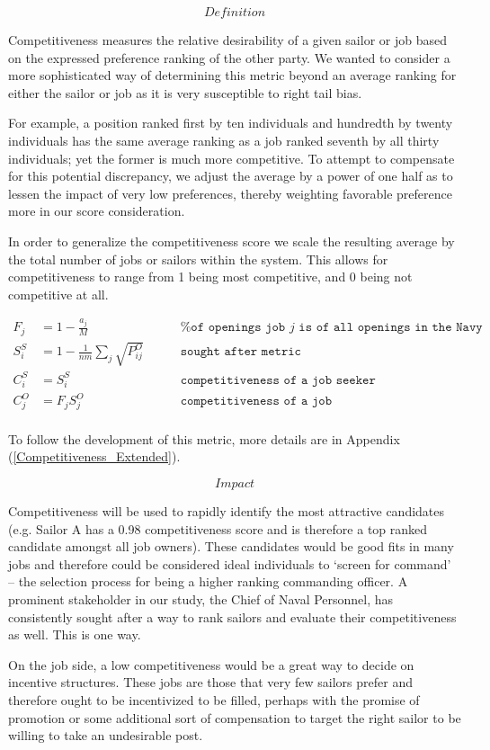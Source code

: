 \[\textit{Definition}\]

Competitiveness measures the relative desirability of a given sailor or job based on the expressed preference ranking of the other party. We wanted to consider a more sophisticated way of determining this metric beyond an average ranking for either the sailor or job as it is very susceptible to right tail bias.  

For example, a position ranked first by ten individuals and hundredth by twenty individuals has the same average ranking as a job ranked seventh by all thirty individuals; yet the former is much more competitive. To attempt to compensate for this potential discrepancy, we adjust the average by a power of one half as to lessen the impact of very low preferences, thereby weighting favorable preference more in our score consideration. 

In order to generalize the competitiveness score we scale the resulting average by the total number of jobs or sailors within the system. This allows for competitiveness to range from 1 being most competitive, and 0 being not competitive at all.


\begin{align}
F_j &= 1 - \frac{a_j}{M} \quad&&\texttt{ \% of openings job $j$ is of all openings in the Navy} \\ 
S^S_i &= 1 - \frac{1}{nm} \sum_j \sqrt{P_{ij}^O} \quad &&\texttt{ sought after metric} \\
C_i^S &= S^S_i \quad &&\texttt{ competitiveness of a job seeker} \\
C_j^O &= F_j S^O_j \quad  &&\texttt{ competitiveness of a job} \\
\end{align}

To follow the development of this metric, more details are in Appendix (\ref{Competitiveness_Extended}).

\[\textit{Impact}\]

Competitiveness will be used to rapidly identify the most attractive candidates (e.g. Sailor A has a 0.98 competitiveness score and is therefore a top ranked candidate amongst all job owners). These candidates would be good fits in many jobs and therefore could be considered ideal individuals to ‘screen for command’ -- the selection process for being a higher ranking commanding officer. A prominent stakeholder in our study, the Chief of Naval Personnel, has consistently sought after a way to rank sailors and evaluate their competitiveness as well. This is one way. 

On the job side, a low competitiveness would be a great way to decide on incentive structures. These jobs are those that very few sailors prefer and therefore ought to be incentivized to be filled, perhaps with the promise of promotion or some additional sort of compensation to target the right sailor to be willing to take an undesirable post. 
 